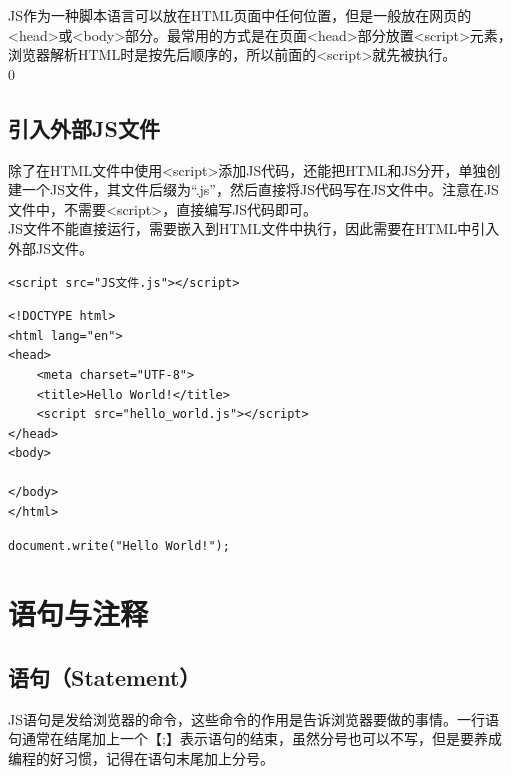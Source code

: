 JS作为一种脚本语言可以放在HTML页面中任何位置，但是一般放在网页的<head>或<body>部分。最常用的方式是在页面<head>部分放置<script>元素，浏览器解析HTML时是按先后顺序的，所以前面的<script>就先被执行。\\0

\subsection{引入外部JS文件}

除了在HTML文件中使用<script>添加JS代码，还能把HTML和JS分开，单独创建一个JS文件，其文件后缀为“.js”，然后直接将JS代码写在JS文件中。注意在JS文件中，不需要<script>，直接编写JS代码即可。\\

JS文件不能直接运行，需要嵌入到HTML文件中执行，因此需要在HTML中引入外部JS文件。\\

\begin{lstlisting}[style=htmlcssjs]
<script src="JS文件.js"></script>
\end{lstlisting}

\vspace{0.5cm}


\begin{lstlisting}[style=htmlcssjs, title=hello\_world.html]
<!DOCTYPE html>
<html lang="en">
<head>
    <meta charset="UTF-8">
    <title>Hello World!</title>
    <script src="hello_world.js"></script>
</head>
<body>

</body>
</html>
\end{lstlisting}

\begin{lstlisting}[style=htmlcssjs, title=hello\_world.js]
document.write("Hello World!");
\end{lstlisting}

\newpage

\section{语句与注释}

\subsection{语句（Statement）}

JS语句是发给浏览器的命令，这些命令的作用是告诉浏览器要做的事情。一行语句通常在结尾加上一个【;】表示语句的结束，虽然分号也可以不写，但是要养成编程的好习惯，记得在语句末尾加上分号。\\

